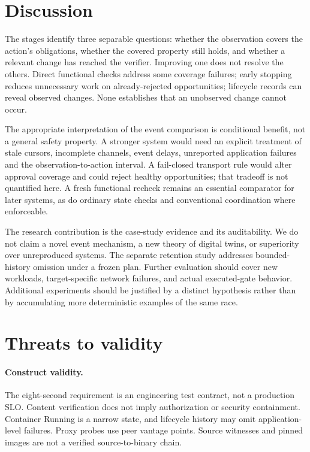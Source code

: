 \documentclass[manuscript,review,nonacm]{acmart}
\begin{document}
\section{Discussion}
The stages identify three separable questions: whether the observation covers the action's obligations, whether the covered property still holds, and whether a relevant change has reached the verifier. Improving one does not resolve the others. Direct functional checks address some coverage failures; early stopping reduces unnecessary work on already-rejected opportunities; lifecycle records can reveal observed changes. None establishes that an unobserved change cannot occur.

The appropriate interpretation of the event comparison is conditional benefit, not a general safety property. A stronger system would need an explicit treatment of stale cursors, incomplete channels, event delays, unreported application failures and the observation-to-action interval. A fail-closed transport rule would alter approval coverage and could reject healthy opportunities; that tradeoff is not quantified here. A fresh functional recheck remains an essential comparator for later systems, as do ordinary state checks and conventional coordination where enforceable.

The research contribution is the case-study evidence and its auditability. We do not claim a novel event mechanism, a new theory of digital twins, or superiority over unreproduced systems. The separate retention study addresses bounded-history omission under a frozen plan. Further evaluation should cover new workloads, target-specific network failures, and actual executed-gate behavior. Additional experiments should be justified by a distinct hypothesis rather than by accumulating more deterministic examples of the same race.

\section{Threats to validity}
\paragraph{Construct validity.} The eight-second requirement is an engineering test contract, not a production SLO. Content verification does not imply authorization or security containment. Container Running is a narrow state, and lifecycle history may omit application-level failures. Proxy probes use peer vantage points. Source witnesses and pinned images are not a verified source-to-binary chain.
\end{document}
